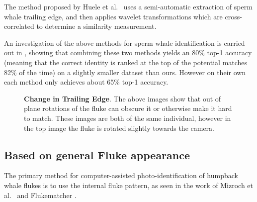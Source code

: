 The method proposed by Huele et al.\ \cite{huele2000finding} uses a semi-automatic extraction of sperm whale trailing edge, and then applies wavelet transformations which are cross-correlated to determine a similarity measurement.

An investigation of the above methods for sperm whale identification is carried out in \cite{beekmans2005comparison}, showing that combining these two methods yields an 80\% top-1 accuracy (meaning that the correct identity is ranked at the top of the potential matches 82\% of the time) on a slightly smaller dataset than ours.
However on their own each method only achieves about 65\% top-1 accuracy.

\begin{figure}[t]%
\centering
{}
\newline
{}
\caption{\textbf{Change in Trailing Edge}. The above images show that out of plane rotations of the fluke can obscure it or otherwise make it hard to match. These images are both of the same individual, however in the top image the fluke is rotated slightly towards the camera.}
\label{fig:unclear_te}
\end{figure}

\subsection{Based on general Fluke appearance}


The primary method for computer-assisted photo-identification of humpback whale flukes is to use the internal fluke pattern, as seen in the work of Mizroch et al.\ \cite{mizroch1990computer} and Flukematcher \cite{kniest2010fluke}. 

